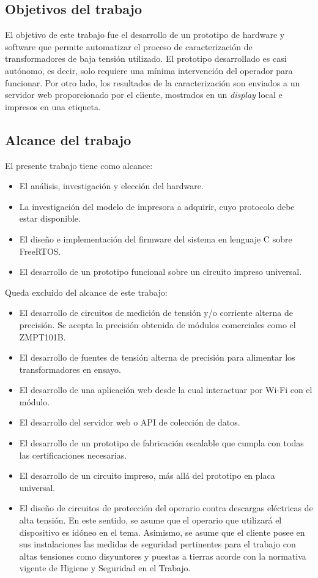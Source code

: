 \subsection{Objetivos del trabajo}

El objetivo de este trabajo fue el desarrollo de un prototipo de hardware y software que permite automatizar el proceso de caracterización de transformadores de baja tensión utilizado. El prototipo desarrollado es casi autónomo, es decir, solo requiere una mínima intervención del operador para funcionar. Por otro lado, los resultados de la caracterización son enviados a un servidor web proporcionado por el cliente, mostrados en un \textit{display} local e impresos en una etiqueta.

\subsection{Alcance del trabajo}
El presente trabajo tiene como alcance:
\begin{itemize}
\item El análisis, investigación y elección del hardware.
\item La investigación del modelo de impresora a adquirir, cuyo protocolo debe estar disponible.
\item El diseño e implementación del firmware del sistema en lenguaje C sobre FreeRTOS.
\item El desarrollo de un prototipo funcional sobre un circuito impreso universal.
\end{itemize}

Queda excluido del alcance de este trabajo:
\begin{itemize}
\item El desarrollo de circuitos de medición de tensión y/o corriente alterna de precisión. Se acepta la precisión obtenida de módulos comerciales como el ZMPT101B.
\item El desarrollo de fuentes de tensión alterna de precisión para alimentar los transformadores en ensayo.
\item El desarrollo de una aplicación web desde la cual interactuar por Wi-Fi con el módulo.
\item El desarrollo del servidor web o API de colección de datos.
\item El desarrollo de un prototipo de fabricación escalable que cumpla con todas las certificaciones necesarias.
\item El desarrollo de un circuito impreso, más allá del prototipo en placa universal.
\item El diseño de circuitos de protección del operario contra descargas eléctricas de alta tensión. En este sentido, se asume que el operario que utilizará el dispositivo es idóneo en el tema. Asimismo, se asume que el cliente posee en sus instalaciones las medidas de seguridad pertinentes para el trabajo con altas tensiones como disyuntores y puestas a tierras acorde con la normativa vigente de Higiene y Seguridad en el Trabajo.
\end{itemize}
